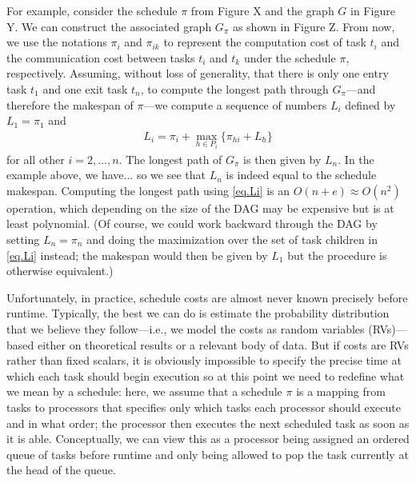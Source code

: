 \documentclass[12pt]{article}
\begin{document}
For example, consider the schedule $\pi$ from Figure X and the graph $G$ in Figure Y. We can construct the associated graph $G_\pi$ as shown in Figure Z. From now, we use the notations $\pi_i$ and $\pi_{ik}$ to represent the computation cost of task $t_i$ and the communication cost between tasks $t_i$ and $t_k$ under the schedule $\pi$, respectively. Assuming, without loss of generality, that there is only one entry task $t_1$ and one exit task $t_n$, to compute the longest path through $G_\pi$---and therefore the makespan of $\pi$---we compute a sequence of numbers $L_i$ defined by $L_1 = \pi_1$ and
\begin{align}
  \label{eq.Li}
  L_i = \pi_i + \max_{h \in P_i}\{ \pi_{hi} + L_h\}
\end{align}
for all other $i = 2, \dots, n$. The longest path of $G_\pi$ is then given by $L_n$. In the example above, we have... so we see that $L_n$ is indeed equal to the schedule makespan. Computing the longest path using \eqref{eq.Li} is an $O(n + e) \approx O(n^2)$ operation, which depending on the size of the DAG may be expensive but is at least polynomial. (Of course, we could work backward through the DAG by setting $L_n = \pi_n$ and doing the maximization over the set of task children in \eqref{eq.Li} instead; the makespan would then be given by $L_1$ but the procedure is otherwise equivalent.)

Unfortunately, in practice, schedule costs are almost never known precisely before runtime. Typically, the best we can do is estimate the probability distribution that we believe they follow---i.e., we model the costs as random variables (RVs)---based either on theoretical results or a relevant body of data. But if costs are RVs rather than fixed scalars, it is obviously impossible to specify the precise time at which each task should begin execution so at this point we need to redefine what we mean by a schedule: here, we assume that a schedule $\pi$ is a mapping from tasks to processors that specifies only which tasks each processor should execute and in what order; the processor then executes the next scheduled task as soon as it is able. Conceptually, we can view this as a processor being assigned an ordered queue of tasks before runtime and only being allowed to pop the task currently at the head of the queue. 
\end{document}
